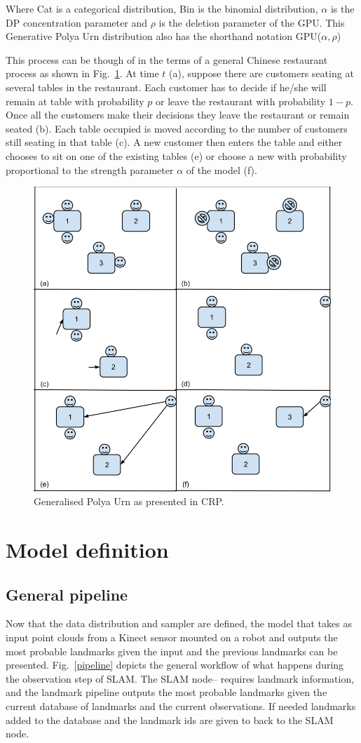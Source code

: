 \documentclass[twoside,hidelinks]{article}
\begin{document}
Where Cat is a categorical distribution, Bin is the binomial distribution, $\alpha$ is the DP concentration parameter and $\rho$ is the deletion parameter of the GPU. This Generative Polya Urn distribution also has the shorthand notation GPU($\alpha,\rho$)

This process can be though of in the terms of a general Chinese restaurant process as shown in Fig.~\ref{generalPolya}. At time $t$ (a), suppose there are customers seating at several tables in the restaurant. Each customer has to decide if he/she will remain at table with probability $p$ or leave the restaurant with probability $1-p$. Once all the customers make their decisions they leave the restaurant or remain seated (b). Each table occupied is moved according to the number of customers still seating in that table (c). A new customer then enters the table and either chooses to sit on one of the existing tables (e) or choose a new with probability proportional to the strength parameter $\alpha$ of the model (f).

\begin{figure}[h!]
  \centering
    \includegraphics[width=.65\textwidth]{generalPolya}
    \caption{Generalised Polya Urn as presented in CRP.}
  \label{generalPolya}
\end{figure}

\section{Model definition}
\label{sec:model}

\subsection{General pipeline}
Now that the data distribution and sampler are defined, the model that takes as input point clouds from a Kinect sensor mounted on a robot and outputs the most probable landmarks given the input and the previous landmarks can be presented. Fig.~\ref{pipeline} depicts the general workflow of what happens during the observation step of SLAM. The SLAM node-- requires landmark information, and the landmark pipeline outputs the most probable landmarks given the current database of landmarks and the current observations. If needed landmarks added to the database and the landmark ids are given to back to the SLAM node.
\end{document}
